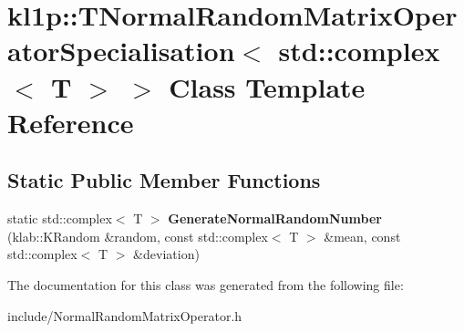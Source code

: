 \hypertarget{classkl1p_1_1TNormalRandomMatrixOperatorSpecialisation_3_01std_1_1complex_3_01T_01_4_01_4}{}\section{kl1p\+:\+:T\+Normal\+Random\+Matrix\+Operator\+Specialisation$<$ std\+:\+:complex$<$ T $>$ $>$ Class Template Reference}
\label{classkl1p_1_1TNormalRandomMatrixOperatorSpecialisation_3_01std_1_1complex_3_01T_01_4_01_4}
\subsection*{Static Public Member Functions}
\begin{DoxyCompactItemize}
\item 
static std\+::complex$<$ T $>$ {\bfseries Generate\+Normal\+Random\+Number} (klab\+::\+K\+Random \&random, const std\+::complex$<$ T $>$ \&mean, const std\+::complex$<$ T $>$ \&deviation)\hypertarget{classkl1p_1_1TNormalRandomMatrixOperatorSpecialisation_3_01std_1_1complex_3_01T_01_4_01_4_a33c82796562491693d6243c8a6436805}{}\label{classkl1p_1_1TNormalRandomMatrixOperatorSpecialisation_3_01std_1_1complex_3_01T_01_4_01_4_a33c82796562491693d6243c8a6436805}

\end{DoxyCompactItemize}


The documentation for this class was generated from the following file\+:\begin{DoxyCompactItemize}
\item 
include/Normal\+Random\+Matrix\+Operator.\+h\end{DoxyCompactItemize}
